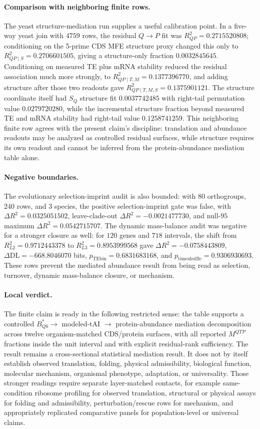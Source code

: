 \paragraph{Comparison with neighboring finite rows.}
The yeast structure-mediation run supplies a useful calibration point.  In a five-way yeast join with $4759$ rows, the residual $Q\to P$ fit was $R^2_{QP}=0.2715520808$; conditioning on the 5-prime CDS MFE structure proxy changed this only to $R^2_{QP\mid S}=0.2706601505$, giving a structure-only fraction $0.0032845645$.  Conditioning on measured TE plus mRNA stability reduced the residual association much more strongly, to $R^2_{QP\mid T,M}=0.1377396770$, and adding structure after those two readouts gave $R^2_{QP\mid T,M,S}=0.1375901121$.  The structure coordinate itself had $S_Q$ structure fit $0.0037742485$ with right-tail permutation value $0.0279720280$, while the incremental structure fraction beyond measured TE and mRNA stability had right-tail value $0.1258741259$.  This neighboring finite row agrees with the present claim's discipline: translation and abundance readouts may be analyzed as controlled residual surfaces, while structure requires its own readout and cannot be inferred from the protein-abundance mediation table alone.

\paragraph{Negative boundaries.}
The evolutionary selection-imprint audit is also bounded: with $80$ orthogroups, $240$ rows, and $3$ species, the positive selection-imprint gate was false, with $\Delta R^2=0.0325051502$, leave-clade-out $\Delta R^2=-0.0021477730$, and null-$95$ maximum $\Delta R^2=0.0542715707$.  The dynamic mass-balance audit was negative for a stronger closure as well: for $120$ genes and $718$ intervals, the shift from $R^2_{L2}=0.9712443378$ to $R^2_{L3}=0.8953999568$ gave $\Delta R^2=-0.0758443809$, $\Delta\mathrm{DL}=-668.8046070$ bits, $p_{\mathrm{TEbin}}=0.6831683168$, and $p_{\mathrm{timeshuffle}}=0.9306930693$.  These rows prevent the mediated abundance result from being read as selection, turnover, dynamic mass-balance closure, or mechanism.

\paragraph{Local verdict.}
The finite claim is ready in the following restricted sense: the table supports a controlled $B^*_{Q6}\to$ modeled-tAI $\to$ protein-abundance mediation decomposition across twelve organism-matched CDS/protein surfaces, with all reported $M^{QTP}$ fractions inside the unit interval and with explicit residual-rank sufficiency.  The result remains a cross-sectional statistical mediation result.  It does not by itself establish observed translation, folding, physical admissibility, biological function, molecular mechanism, organismal phenotype, adaptation, or universality.  Those stronger readings require separate layer-matched contacts, for example same-condition ribosome profiling for observed translation, structural or physical assays for folding and admissibility, perturbation/rescue rows for mechanism, and appropriately replicated comparative panels for population-level or universal claims.

